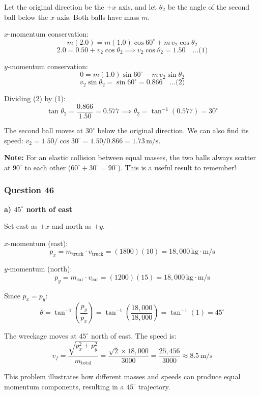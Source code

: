 \documentclass[12pt,letterpaper]{article}
\begin{document}
\begin{explanationbox}
Let the original direction be the $+x$ axis, and let $\theta_2$ be the angle of the second ball below the $x$-axis. Both balls have mass $m$.

$x$-momentum conservation:
\[
m(2.0) = m(1.0)\cos 60^\circ + m\,v_2\cos\theta_2
\]
\[
2.0 = 0.50 + v_2\cos\theta_2 \implies v_2\cos\theta_2 = 1.50 \quad \text{...(1)}
\]

$y$-momentum conservation:
\[
0 = m(1.0)\sin 60^\circ - m\,v_2\sin\theta_2
\]
\[
v_2\sin\theta_2 = \sin 60^\circ = 0.866 \quad \text{...(2)}
\]

Dividing (2) by (1):
\[
\tan\theta_2 = \frac{0.866}{1.50} = 0.577 \implies \theta_2 = \tan^{-1}(0.577) = 30^\circ
\]

The second ball moves at $30^\circ$ below the original direction. We can also find its speed: $v_2 = 1.50/\cos 30^\circ = 1.50/0.866 = 1.73\,\text{m/s}$.

\textbf{Note:} For an elastic collision between equal masses, the two balls always scatter at $90^\circ$ to each other ($60^\circ + 30^\circ = 90^\circ$). This is a useful result to remember!
\end{explanationbox}

\subsubsection*{Question 46}

\begin{answerbox}
\textbf{a) $45^\circ$ north of east}
\end{answerbox}

\begin{explanationbox}
Set east as $+x$ and north as $+y$.

$x$-momentum (east):
\[
p_x = m_{\text{truck}} \cdot v_{\text{truck}} = (1800)(10) = 18{,}000\,\text{kg}\cdot\text{m/s}
\]

$y$-momentum (north):
\[
p_y = m_{\text{car}} \cdot v_{\text{car}} = (1200)(15) = 18{,}000\,\text{kg}\cdot\text{m/s}
\]

Since $p_x = p_y$:
\[
\theta = \tan^{-1}\left(\frac{p_y}{p_x}\right) = \tan^{-1}\left(\frac{18{,}000}{18{,}000}\right) = \tan^{-1}(1) = 45^\circ
\]

The wreckage moves at $45^\circ$ north of east. The speed is:
\[
v_f = \frac{\sqrt{p_x^2 + p_y^2}}{m_{\text{total}}} = \frac{\sqrt{2} \times 18{,}000}{3000} = \frac{25{,}456}{3000} \approx 8.5\,\text{m/s}
\]

This problem illustrates how different masses and speeds can produce equal momentum components, resulting in a $45^\circ$ trajectory.
\end{explanationbox}
\end{document}
